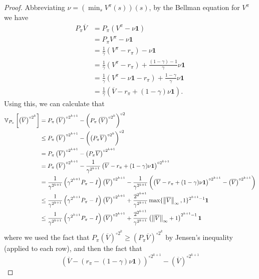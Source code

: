 \documentclass{article}
\theoremstyle{plain}
\theoremstyle{plain}
\theoremstyle{remark}
\theoremstyle{plain}
\theoremstyle{plain}
\newcommand{\Var}{\mathbb{V}}
\newcommand{\one}{\mathbf{1}}
\newcommand{\Vc}{\overline{V}}
\begin{document}
\begin{proof}
Abbreviating $\nu = \left(\min_s V^{\pi}(s)\right)(s)$, by the Bellman equation for $V^\pi$ we have
\begin{align*}
    P_\pi \Vc &= P_\pi (V^\pi - \nu \one) \\
    &= P_\pi V^\pi - \nu \one \\
    &= \frac{1}{\gamma} (V^\pi - r_\pi) - \nu \one \\
    &= \frac{1}{\gamma} (V^\pi - r_\pi) + \frac{(1-\gamma) - 1}{\gamma }\nu \one \\
    &= \frac{1}{\gamma} (V^\pi -\nu \one - r_\pi ) + \frac{1-\gamma}{\gamma}\nu \one \\
    &= \frac{1}{\gamma} \left( \Vc - r_\pi + (1-\gamma) \nu \one\right).
\end{align*}
Using this, we can calculate that
\begin{align*}
    \Var_{P_{\pi}} \left[ \left(\Vc \right)^{\circ 2^k}  \right] &= P_{\pi} \left(\Vc \right)^{\circ 2^{k+1}} - \left(P_{\pi} \left(\Vc \right)^{\circ 2^k} \right)^{\circ 2}\\
    & \leq P_{\pi} \left(\Vc \right)^{\circ 2^{k+1}} - \left(\left( P_{\pi} \Vc \right)^{\circ 2^k} \right)^{\circ 2} \\
    &= P_{\pi} \left(\Vc \right)^{\circ 2^{k+1}} - \left( P_{\pi} \Vc \right)^{\circ 2^{k+1}} \\
    &= P_{\pi} \left(\Vc \right)^{\circ 2^{k+1}} - \frac{1}{\gamma^{2^{k+1}}}\left( \Vc - r_\pi + (1-\gamma) \nu \one \right)^{\circ 2^{k+1}} \\
    &= \frac{1}{\gamma^{2^{k+1}}} \left(\gamma^{2^{k+1}} P_{\pi} - I\right) \left(\Vc \right)^{\circ 2^{k+1}} - \frac{1}{\gamma^{2^{k+1}}} \left( \left( \Vc - r_\pi + (1-\gamma) \nu \one \right)^{\circ 2^{k+1}} - \left(\Vc \right)^{\circ 2^{k+1}} \right) \\
    & \leq \frac{1}{\gamma^{2^{k+1}}} \left(\gamma^{2^{k+1}} P_{\pi} - I\right) \left(\Vc \right)^{\circ 2^{k+1}} + \frac{2^{2^{k+1}}}{\gamma^{2^{k+1}}} \max\{\infnorm{\Vc},1\}^{2^{k+1}-1} \one \\
    & \leq \frac{1}{\gamma^{2^{k+1}}} \left(\gamma^{2^{k+1}} P_{\pi} - I\right) \left(\Vc \right)^{\circ 2^{k+1}} + \frac{2^{2^{k+1}}}{\gamma^{2^{k+1}}} \left(\infnorm{\Vc} + 1 \right)^{2^{k+1}-1} \one
\end{align*}
where we used the fact that $P_{\pi} \left(\Vc \right)^{\circ 2^k} \geq \left( P_{\pi} \Vc \right)^{\circ 2^k}$ by Jensen's inequality (applied to each row), and then the fact that
\[
 \left( \Vc - (r_\pi - (1-\gamma) \nu \one) \right)^{\circ 2^{k+1}} - \left(\Vc \right)^{\circ 2^{k+1}} 
\]
\end{proof}
\end{document}
